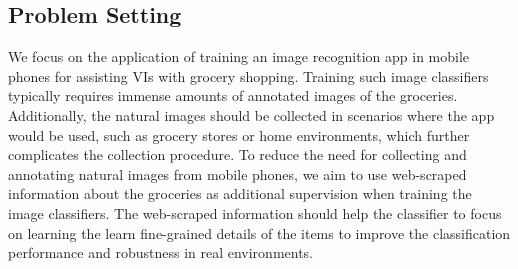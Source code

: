 \subsection{Problem Setting}

We focus on the application of training an image recognition app in mobile phones for assisting VIs with grocery shopping. Training such image classifiers typically requires immense amounts of annotated images of the groceries. Additionally, the natural images should be collected in scenarios where the app would be used, such as grocery stores or home environments, which further complicates the collection procedure. To reduce the need for collecting and annotating natural images from mobile phones, we aim to use web-scraped information about the groceries as additional supervision when training the image classifiers. The web-scraped information should help the classifier to focus on learning the learn fine-grained details of the items to improve the classification performance and robustness in real environments. 


